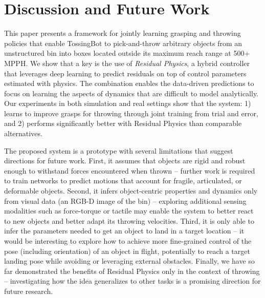 \documentclass[journal]{IEEEtran}
\newcommand{\mypara}[1]{\par\vspace*{0.8mm}\noindent\textbf{\textit{#1}}}
\begin{document}
\section{Discussion and Future Work}

This paper presents a framework for jointly learning grasping and throwing policies that enable TossingBot to pick-and-throw arbitrary objects from an unstructured bin into boxes located outside its maximum reach range at 500+ MPPH. We show that a key is the use of {\em Residual Physics}, a hybrid controller that leverages deep learning to predict residuals on top of control parameters estimated with physics. The combination enables the data-driven predictions to focus on learning the aspects of dynamics that are difficult to model analytically. Our experiments in both simulation and real settings show that the system: 1) learns to improve grasps for throwing through joint training from trial and error, and 2) performs significantly better with Residual Physics than comparable alternatives. %

The proposed system is a prototype with several limitations that suggest directions for future work. First, it assumes that objects are rigid and robust enough to withstand forces encountered when thrown -- further work is required to train networks to predict motions that account for fragile, articulated, or deformable objects. Second, it infers object-centric properties and dynamics only from visual data (an RGB-D image of the bin) -- exploring additional sensing modalities such as force-torque or tactile may enable the system to better react to new objects and better adapt its throwing velocities. Third, it is only able to infer the parameters needed to get an object to land in a target location -- it would be interesting to explore how to achieve more fine-grained control of the pose (including orientation) of an object in flight, potentially to reach a target landing pose while avoiding or leveraging external obstacles. Finally, we have so far demonstrated the benefits of Residual Physics only in the context of throwing -- investigating how the idea generalizes to other tasks is a promising direction for future research.

\end{document}
